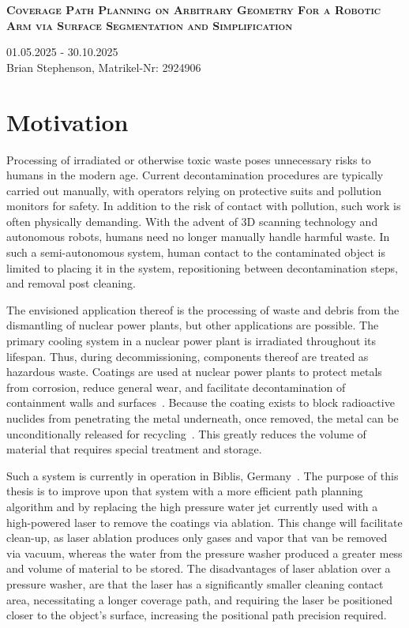 \documentclass[a4paper, 10pt]{article}
\begin{document}
	
\begin{center}
	\fontsize{21pt}{10pt}\selectfont
	\textsc{\textbf{Coverage Path Planning on Arbitrary Geometry For a Robotic Arm via Surface Segmentation and Simplification}}
\end{center}
\begin{center}
	01.05.2025 - 30.10.2025 \\
	Brian Stephenson, Matrikel-Nr: 2924906
\end{center}

\section*{Motivation}
Processing of irradiated or otherwise toxic waste poses unnecessary risks to humans in the modern age.
Current decontamination procedures are typically carried out manually, with operators relying on protective suits and pollution monitors for safety.
In addition to the risk of contact with pollution, such work is often physically demanding.
With the advent of 3D scanning technology and autonomous robots, humans need no longer manually handle harmful waste.
In such a semi-autonomous system, human contact to the contaminated object is limited to placing it in the system, repositioning between decontamination steps, and removal post cleaning.

The envisioned application thereof is the processing of waste and debris from the dismantling of nuclear power plants, but other applications are possible.
The primary cooling system in a nuclear power plant is irradiated throughout its lifespan.
Thus, during decommissioning, components thereof are treated as hazardous waste.
Coatings are used at nuclear power plants to protect metals from corrosion, reduce general wear, and facilitate decontamination of containment walls and surfaces~\cite{NRC_coatings}.
Because the coating exists to block radioactive nuclides from penetrating the metal underneath, once removed, the metal can be unconditionally released for recycling~\cite{NRC_coatings}.
This greatly reduces the volume of material that requires special treatment and storage.

Such a system is currently in operation in Biblis, Germany~\cite{ROBBE}.
The purpose of this thesis is to improve upon that system with a more efficient path planning algorithm and by replacing the high pressure water jet currently used with a high-powered laser to remove the coatings via ablation.
This change will facilitate clean-up, as laser ablation produces only gases and vapor that van be removed via vacuum, whereas the water from the pressure washer produced a greater mess and volume of material to be stored.
The disadvantages of laser ablation over a pressure washer, are that the laser has a significantly smaller cleaning contact area, necessitating a longer coverage path, and requiring the laser be positioned closer to the object's surface, increasing the positional path precision required.
\end{document}
